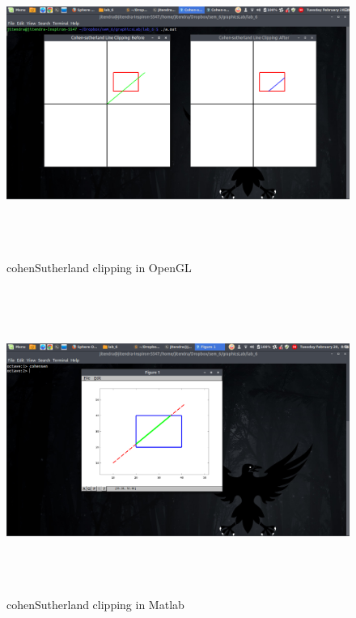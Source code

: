 \begin{figure}[ht!]
\centering
\includegraphics[width=150mm, height=100mm]{openGLOutput.png}
\caption{cohenSutherland clipping in OpenGL \label{overflow}}
\end{figure}
\begin{figure}[ht!]
\centering
\includegraphics[width=150mm, height=100mm]{matlabOutput.png}
\caption{cohenSutherland clipping in Matlab \label{overflow}}
\end{figure}

